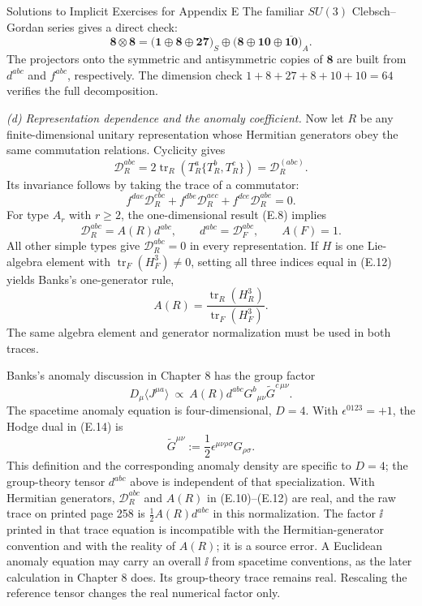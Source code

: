 \begin{bankssolutions}{Solutions to Implicit Exercises for Appendix E}
The familiar $SU(3)$ Clebsch--Gordan series gives a direct check:
\[
  \boldsymbol8\otimes\boldsymbol8
  =\bigl(\boldsymbol1\oplus\boldsymbol8\oplus\boldsymbol{27}\bigr)_S
   \oplus
   \bigl(\boldsymbol8\oplus\boldsymbol{10}
          \oplus\overline{\boldsymbol{10}}\bigr)_A.
  \tag{E.9}
\]
The projectors onto the symmetric and antisymmetric copies of
$\boldsymbol8$ are built from $d^{abc}$ and $f^{abc}$, respectively.  The
dimension check $1+8+27+8+10+10=64$ verifies the full decomposition.

\medskip\noindent
\textit{(d) Representation dependence and the anomaly coefficient.}
Now let $R$ be any finite-dimensional unitary representation whose Hermitian
generators obey the same commutation relations.  Cyclicity gives
\[
  \mathcal D_R^{abc}
  =2\operatorname{tr}_R\!\left(T_R^a\{T_R^b,T_R^c\}\right)
  =\mathcal D_R^{(abc)}.
  \tag{E.10}
\]
Its invariance follows by taking the trace of a commutator:
\[
  f^{dae}\mathcal D_R^{ebc}
  +f^{dbe}\mathcal D_R^{aec}
  +f^{dce}\mathcal D_R^{abe}=0.
  \tag{E.11}
\]
For type $A_r$ with $r\geq2$, the one-dimensional result (E.8) implies
\[
  \mathcal D_R^{abc}=A(R)d^{abc},
  \qquad d^{abc}=\mathcal D_F^{abc},
  \qquad A(F)=1.
  \tag{E.12}
\]
All other simple types give $\mathcal D_R^{abc}=0$ in every representation.
If $H$ is one Lie-algebra element with
$\operatorname{tr}_F(H_F^3)\ne0$, setting all three indices equal in (E.12)
yields Banks's one-generator rule,
\[
  A(R)=\frac{\operatorname{tr}_R(H_R^3)}
             {\operatorname{tr}_F(H_F^3)}.
  \tag{E.13}
\]
The same algebra element and generator normalization must be used in both
traces.

Banks's anomaly discussion in Chapter 8 has the group factor
\[
  D_\mu\langle J^{\mu a}\rangle
  \ \propto\ A(R)d^{abc}
  G^b{}_{\mu\nu}\widetilde G^{c\,\mu\nu}.
  \tag{E.14}
\]
The spacetime anomaly equation is four-dimensional, $D=4$.  With
$\epsilon^{0123}=+1$, the Hodge dual in (E.14) is
\[
  \widetilde G^{\mu\nu}
  :=\frac12\epsilon^{\mu\nu\rho\sigma}G_{\rho\sigma}.
\]
This definition and the corresponding anomaly density are specific to
$D=4$; the group-theory tensor $d^{abc}$ above is independent of that
specialization.
With Hermitian generators, $\mathcal D_R^{abc}$ and $A(R)$ in (E.10)--(E.12)
are real, and the raw trace on printed page 258 is
$\tfrac12 A(R)d^{abc}$ in this normalization.  The factor $\ii$ printed in
that trace equation is incompatible with the Hermitian-generator convention
and with the reality of $A(R)$; it is a source error.  A Euclidean anomaly
equation may carry an overall $\ii$ from spacetime conventions, as the later
calculation in Chapter 8 does.  Its group-theory trace remains real.
Rescaling the reference tensor changes the real numerical factor only.


\end{bankssolutions}
